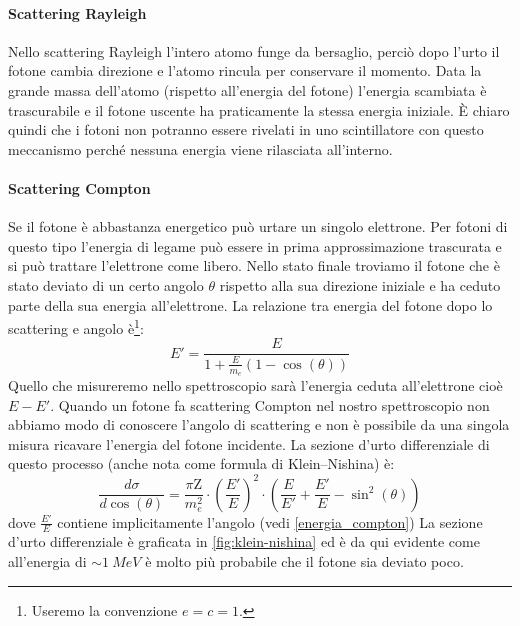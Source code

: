  \paragraph{Scattering Rayleigh}
 Nello scattering Rayleigh l'intero atomo funge da bersaglio, perciò dopo l'urto il fotone cambia direzione e l'atomo rincula per conservare il momento. Data la grande massa dell'atomo (rispetto all'energia del fotone) l'energia scambiata è trascurabile e il fotone uscente ha praticamente la stessa energia iniziale. \`E chiaro quindi che i fotoni non potranno essere rivelati in uno scintillatore con questo meccanismo perché nessuna energia viene rilasciata all'interno.
 
 \paragraph{Scattering Compton}
 Se il fotone è abbastanza energetico può urtare un singolo elettrone. Per fotoni di questo tipo l'energia di legame può essere in prima approssimazione trascurata e si può trattare l'elettrone come libero. Nello stato finale troviamo il fotone che è stato deviato di un certo angolo $\theta$ rispetto alla sua direzione iniziale e ha ceduto parte della sua energia all'elettrone. La relazione tra energia del fotone dopo lo scattering e angolo è\footnote{Useremo la convenzione $e = c = 1$.}:
 \begin{equation}
 \label{energia_compton} 
 E' = \frac{E}{1+\frac{E}{m_e}(1-\cos(\theta))} 
 \end{equation}
 Quello che misureremo nello spettroscopio sarà l'energia ceduta all'elettrone cioè $E-E'$. Quando un fotone fa scattering Compton nel nostro spettroscopio non abbiamo modo di conoscere l'angolo di scattering e non è possibile da una singola misura ricavare l'energia del fotone incidente.
 La sezione d'urto differenziale di questo processo (anche nota come formula di Klein–Nishina) è:
 \begin{equation}
 \label{klein-nishina}
 \frac{d\sigma}{d\cos(\theta)} = \frac{\pi\text{Z}}{m_e^2} \cdot\left(\frac{E'}{E}\right)^2 \cdot \left(\frac{E}{E'} + \frac{E'}{E} - \sin^2(\theta)\right)
 \end{equation}
 dove $\frac{E'}{E}$ contiene implicitamente l'angolo (vedi \autoref{energia_compton})
 La sezione d'urto differenziale è graficata in \autoref{fig:klein-nishina} ed è da qui evidente come all'energia di $\sim \SI{1}{MeV}$ è molto più probabile che il fotone sia deviato poco.
 
